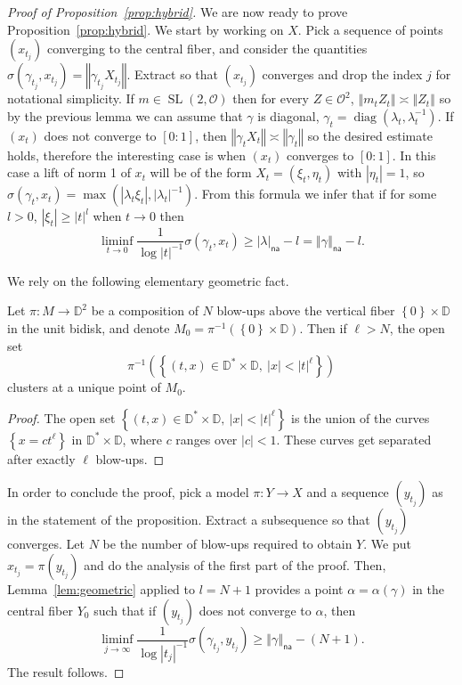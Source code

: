 \documentclass[AHL,Unicode,longabstracts]{cedram}
\DeclareMathOperator{\SL}{SL}
\DeclareMathOperator{\diag}{diag}
\newcommand{\dD}{\mathbb{D}}
\newcommand{\cv}{\rightarrow}
\newcommand{\set}[1]{\left\{#1\right\}}
\newcommand{\norm}[1]{\left\Vert#1\right\Vert}
\newcommand{\abs}[1]{\left\vert#1\right\vert}
\newcommand{\unsur}[1]{\frac{1}{#1}}
\newcommand{\lrpar}[1]{\left(#1\right)}
\newcommand{\la}{\lambda}
\newcommand{\na}{\mathsf{na}}
\newcommand{\inv}{^{-1}}
\begin{document}
\begin{proof}[Proof of Proposition~\ref{prop:hybrid}]
We are now ready to prove Proposition~\ref{prop:hybrid}. We start by working on $X$. Pick a sequence of points $(x_{t_j})$ converging to the central fiber, and consider the quantities $\sigma(\gamma_{t_j}, x_{t_j}) = \norm{\gamma_{t_j}X_{t_j}}$. Extract so that $(x_{t_j})$ converges and drop the index $j$ for notational simplicity. If $m\in \SL(2, \mathcal{O})$ then for every $Z\in \mathcal O^2$, $\norm{ m_t Z_t}\asymp \norm{Z_t}$ so by the previous lemma we can assume that $\gamma$ is diagonal, $\gamma_t =\diag(\lambda_t, \lambda_t\inv)$. If $(x_{t})$ does not converge to $[0:1]$, then $\norm{\gamma_{t}X_{t}} \asymp \norm{\gamma_{t}}$ so the desired estimate holds, therefore the interesting case is when $(x_{t})$ converges to $[0:1]$. In this case a lift of norm 1 of $x_t$ will be of the form $X_{t} = (\xi_t, \eta_t)$ with $\abs{\eta_t} = 1$, so $\sigma (\gamma_t, x_t) = \max(\abs{\la_t\xi_t}, \abs{\la_t}\inv)$. From this formula we infer that if for some $l>0$, $\abs{\xi_t} \geq \abs{t}^l$ when $t\cv 0$ then
\[
\liminf_{t\to 0} \unsur{\log\abs{t}\inv} \sigma (\gamma_t, x_t) \geq \abs{\la}_\na -l = \norm{\gamma}_\na -l.
\]

We rely on the following elementary geometric fact.

\begin{lemm}\label{lem:geometric}
Let $\pi:M\cv \dD^2$ be a composition of $N$ blow-ups above the vertical fiber $\set{0}\times \dD$ in the unit bidisk, and denote $M_0 = \pi\inv(\set{0}\times \dD)$.
Then if $\ell>N$, the open set
\[
\pi\inv\lrpar{\set{(t,x)\in \dD^*\times \dD, \ \abs{x}<\abs{t}^\ell}}
\]
clusters at a unique point of $M_0$.
\end{lemm}
\begin{proof}
The open set $\set{(t,x)\in \dD^*\times \dD, \ \abs{x}<\abs{t}^\ell}$ is the union of the curves $\set{ x= c t^\ell}$ in $\dD^*\times \dD$, where $c$ ranges over $\abs{c}<1$. These curves get separated after exactly $\ell$ blow-ups.
\end{proof}

In order to conclude the proof, pick a model $\pi: Y\to X$ and a sequence $(y_{t_j})$ as in the statement of the proposition. Extract a subsequence so that $(y_{t_j})$ converges. Let $N$ be the number of blow-ups required to obtain $Y$. We put $x_{t_j} = \pi(y_{t_j})$ and do the analysis of the first part of the proof. Then, Lemma~\ref{lem:geometric} applied to $l = N+1$ provides a point $\alpha = \alpha(\gamma)$ in the central fiber $Y_0$ such that if $(y_{t_j})$ does not converge to $\alpha$, then
\[
\liminf_{j\cv\infty} \unsur{\log\abs{t_j}\inv} \sigma (\gamma_{t_j}, y_{t_j}) \geq \norm{\gamma}_\na -(N+1).
\]
The result follows.
\end{proof}
\end{document}
